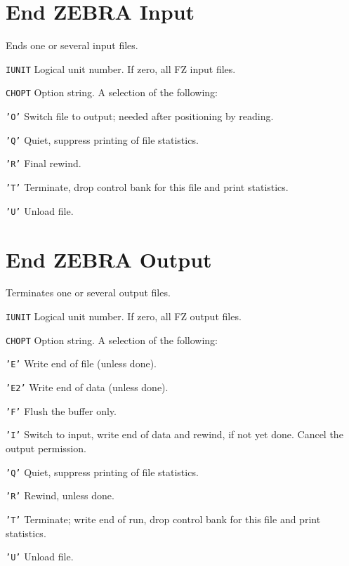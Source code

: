 \section{End ZEBRA Input}
\label{FZENDI}
Ends one or several input files.
\begin{mylist}
\item[\tt IUNIT]
    Logical unit number. If zero, all FZ input files.
\item[\tt CHOPT]
    Option string. A selection of the following:
    \begin{mylist}
    \item[\tt 'O']
        Switch file to output; needed after positioning by reading.
    \item[\tt 'Q']
        Quiet, suppress printing of file statistics.
    \item[\tt 'R']
        Final rewind.
    \item[\tt 'T']
        Terminate, drop control bank for this file and print statistics.
    \item[\tt 'U']
        Unload file.
    \end{mylist}
\end{mylist}

\section{End ZEBRA Output}
\label{FZENDO}
Terminates one or several output files.
\begin{mylist}
  \item[\tt IUNIT]
    Logical unit number. If zero, all FZ output files.
  \item[\tt CHOPT]
    Option string. A selection of the following:
    \begin{mylist}
    \item[\tt 'E']
        Write end of file (unless done).
    \item[\tt 'E2']
        Write end of data (unless done).
    \item[\tt 'F']
        Flush the buffer only.
    \item[\tt 'I']
        Switch to input, write end of data and rewind, if not yet done.
        Cancel the output permission.   
    \item[\tt 'Q']
        Quiet, suppress printing of file statistics.
    \item[\tt 'R']
        Rewind, unless done.
    \item[\tt 'T']
        Terminate; write end of run,
        drop control bank for this file and print statistics.
    \item[\tt 'U']
        Unload file.
    \end{mylist}
\end{mylist}

